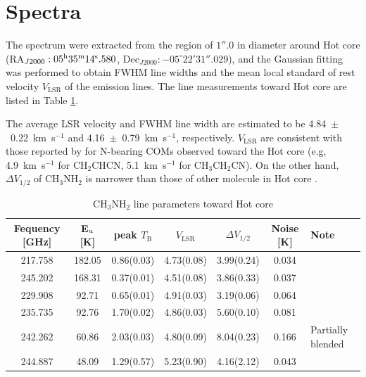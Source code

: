 \section{Spectra}
The spectrum were extracted from the region of $1''.0$ in diameter around 
Hot core (RA$_{J2000}: 05^{\rm{h}}35^{\rm{m}}14^{\rm{s}}.580$, Dec$_{J2000}:-05^{\circ}22'31''.029$), 
and the Gaussian fitting was performed to obtain FWHM line widths and the mean local standard of 
rest velocity $V_{\mathrm{LSR}}$ of the emission lines.
The line measurements toward Hot core are listed in Table \ref{tab:paraOri}.


The average LSR velocity and FWHM line width are estimated to be 4.84~$\pm$~0.22~km~s$^{-1}$ and 
4.16~$\pm$~0.79~km~s$^{-1}$, respectively.
 $V_{\mathrm{LSR}}$ are consistent with those reported by \citet{Feng+2015} 
 for N-bearing COMs observed toward the Hot core
 (e.g, 4.9~km~s$^{-1}$ for CH$_2$CHCN, 5.1~km~s$^{-1}$ for CH$_3$CH$_2$CN).
On the other hand, $\Delta V_{1/2}$ of CH$_3$NH$_2$ is narrower than those of other molecule in Hot core
\citep[typically 5--15~km~s$^{-1}$,][]{Pagani+2017}.

\renewcommand{\arraystretch}{1.5}
\begin{table}[htb]
\begin{center}

  \caption{CH$_3$NH$_2$ line parameters toward Hot core}
  \label{tab:paraOri}
{\scriptsize
  \begin{tabular}{ccccccl} \hline
   Fequency [GHz]& E$_{\rm{u}}$ [K] &  peak $T_{\mathrm{B}}$\footnotemark[1] [K] & $V_{\mathrm{LSR}}$\footnotemark[1] [km s$^{-1}$] & $\Delta V_{1/2}$\footnotemark[1] [km s$^{-1}$] & Noise [K]  & Note \\ \hline 
    217.758  & 182.05 &  0.86(0.03) & 4.73(0.08) & 3.99(0.24) & 0.034 & \\
    245.202 & 168.31 & 0.37(0.01) & 4.51(0.08) & 3.86(0.33) & 0.037 & \\
    229.908  & 92.71 &  0.65(0.01) & 4.91(0.03) & 3.19(0.06)& 0.064&\\ 
    235.735  & 92.76 & 1.70(0.02) & 4.86(0.03) & 5.60(0.10)& 0.081 & \\
    242.262  & 60.86 &  2.03(0.03) & 4.80(0.09) & 8.04(0.23) & 0.166 & Partially blended \\
    244.887  & 48.09 & 1.29(0.57)& 5.23(0.90) & 4.16(2.12) & 0.043 & \\ \hline
  \end{tabular}
  }
\end{center}
\end{table}

